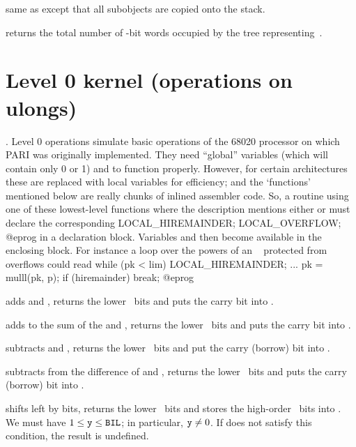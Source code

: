  same as  except that all subobjects
are copied onto the stack.

 returns the total number of \B-bit words occupied
by the tree representing~.

\section{Level 0 kernel (operations on ulongs)}

.
Level 0 operations simulate basic operations of the 68020 processor on which
PARI was originally implemented. They need ``global''  variables
 (which will contain only 0 or 1) and  to
function properly. However, for certain architectures these are replaced with
local variables for efficiency; and the `functions' mentioned below are
really chunks of inlined assembler code. So, a routine using one of these
lowest-level functions where the description mentions either
 or  must declare the corresponding
\bprog
  LOCAL_HIREMAINDER;
  LOCAL_OVERFLOW;
@eprog\noindent
in a declaration block. Variables  and  then
become available in the enclosing block. For instance a loop over the powers
of an ~ protected from overflows could read
\bprog
 while (pk < lim)
 {
   LOCAL_HIREMAINDER;
   ...
   pk = mulll(pk, p); if (hiremainder) break;
 }
@eprog

 adds  and , returns the
lower \B\ bits and puts the carry bit into .

 adds  to the sum of the
 and , returns the lower \B\ bits and puts the carry bit into
.

 subtracts  and , returns
the lower \B\ bits and put the carry (borrow) bit into .

 subtracts  from the
difference of  and , returns the lower \B\ bits and puts the
carry (borrow) bit into .

 shifts  left by  bits,
returns the lower \B\ bits and stores the high-order \B\ bits into
. We must have $1\le{\tt y}\le{\tt BIL}$; in particular,
${\tt y}\neq 0$. If  does not satisfy this condition, the result is
undefined.

